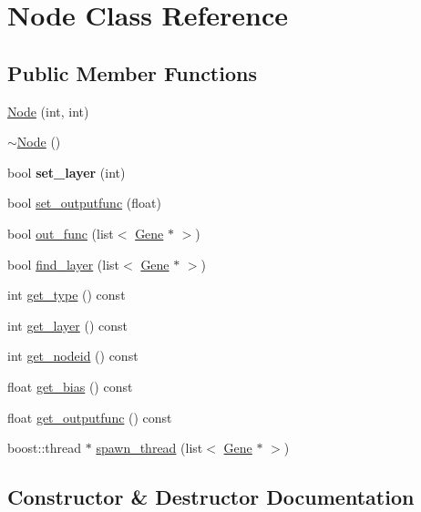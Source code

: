 \hypertarget{classNode}{}\section{Node Class Reference}
\label{classNode}
\subsection*{Public Member Functions}
\begin{DoxyCompactItemize}
\item 
\hyperlink{classNode_a6c6394094966c834cdd4f45cfda2377c}{Node} (int, int)
\item 
\hyperlink{classNode_aa0840c3cb5c7159be6d992adecd2097c}{$\sim$\+Node} ()
\item 
bool {\bfseries set\+\_\+layer} (int)\hypertarget{classNode_a7b15b4dd9ffb26158dff49d18121d12b}{}\label{classNode_a7b15b4dd9ffb26158dff49d18121d12b}

\item 
bool \hyperlink{classNode_ad6baa18624ebc6a84050dd1f5878c66f}{set\+\_\+outputfunc} (float)
\item 
bool \hyperlink{classNode_a3d0bbe8ed51dd67afdc1d7c8f7e4a01e}{out\+\_\+func} (list$<$ \hyperlink{classGene}{Gene} $\ast$ $>$)
\item 
bool \hyperlink{classNode_a7cb1f7ac474d30bc692d65abf2fbd966}{find\+\_\+layer} (list$<$ \hyperlink{classGene}{Gene} $\ast$ $>$)
\item 
int \hyperlink{classNode_acb81e6d489ba89f47c37c00977a29937}{get\+\_\+type} () const 
\item 
int \hyperlink{classNode_aa82caef196b838bfda3ac5bfc5c06108}{get\+\_\+layer} () const 
\item 
int \hyperlink{classNode_a9944e1ed6dcecb558a2612dbee6b1bcf}{get\+\_\+nodeid} () const 
\item 
float \hyperlink{classNode_a4bc9591d26874c667d2823baa70f1317}{get\+\_\+bias} () const 
\item 
float \hyperlink{classNode_a2c71d5b1eb30e2569e24317c07faf814}{get\+\_\+outputfunc} () const 
\item 
boost\+::thread $\ast$ \hyperlink{classNode_a2fd7cfa1fec67c1944f1c8e26619e1e8}{spawn\+\_\+thread} (list$<$ \hyperlink{classGene}{Gene} $\ast$ $>$)
\end{DoxyCompactItemize}


\subsection{Constructor \& Destructor Documentation}
